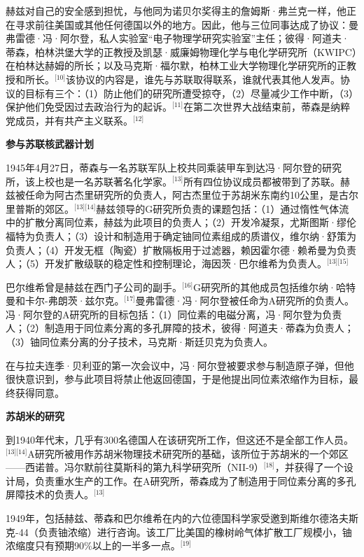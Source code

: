赫兹对自己的安全感到担忧，与他同为诺贝尔奖得主的詹姆斯·弗兰克一样，他正在寻求前往美国或其他任何德国以外的地方。因此，他与三位同事达成了协议：曼弗雷德·冯·阿尔登，私人实验室“电子物理学研究实验室”主任；彼得·阿道夫·蒂森，柏林洪堡大学的正教授及凯瑟·威廉姆物理化学与电化学研究所（KWIPC）在柏林达赫姆的所长；以及马克斯·福尔默，柏林工业大学物理化学研究所的正教授和所长。\(^\text{[10]}\)该协议的内容是，谁先与苏联取得联系，谁就代表其他人发声。协议的目标有三个：（1）防止他们的研究所遭受掠夺，（2）尽量减少工作中断，（3）保护他们免受因过去政治行为的起诉。\(^\text{[11]}\)在第二次世界大战结束前，蒂森是纳粹党成员，并有共产主义联系。\(^\text{[12]}\)

\textbf{参与苏联核武器计划}

1945年4月27日，蒂森与一名苏联军队上校共同乘装甲车到达冯·阿尔登的研究所，该上校也是一名苏联著名化学家。\(^\text{[13]}\)所有四位协议成员都被带到了苏联。赫兹被任命为阿古杰里研究所的负责人，阿古杰里位于苏胡米东南约10公里，是古尔里普斯的郊区。\(^\text{[13][14]}\)赫兹领导的G研究所负责的课题包括：（1）通过惰性气体流中的扩散分离同位素，赫兹为此项目的负责人；（2）开发冷凝泵，尤斯图斯·缪伦福特为负责人；（3）设计和制造用于确定铀同位素组成的质谱仪，维尔纳·舒策为负责人；（4）开发无框（陶瓷）扩散隔板用于过滤器，赖因霍尔德·赖希曼为负责人；（5）开发扩散级联的稳定性和控制理论，海因茨·巴尔维希为负责人。\(^\text{[13][15]}\)

巴尔维希曾是赫兹在西门子公司的副手。\(^\text{[16]}\)G研究所的其他成员包括维尔纳·哈特曼和卡尔-弗朗茨·兹尔克。\(^\text{[17]}\)曼弗雷德·冯·阿尔登被任命为A研究所的负责人。冯·阿尔登的A研究所的目标包括：（1）同位素的电磁分离，冯·阿尔登为负责人；（2）制造用于同位素分离的多孔屏障的技术，彼得·阿道夫·蒂森为负责人；（3）铀同位素分离的分子技术，马克斯·斯廷贝克为负责人。

在与拉夫连季·贝利亚的第一次会议中，冯·阿尔登被要求参与制造原子弹，但他很快意识到，参与此项目将禁止他返回德国，于是他提出同位素浓缩作为目标，最终获得同意。

\textbf{苏胡米的研究}

到1940年代末，几乎有300名德国人在该研究所工作，但这还不是全部工作人员。\(^\text{[13][14]}\)A研究所被用作苏胡米物理技术研究所的基础，该所位于苏胡米的一个郊区——西诺普。冯尔默前往莫斯科的第九科学研究所（NII-9）\(^\text{[18]}\)，并获得了一个设计局，负责重水生产的工作。在A研究所，蒂森成为了制造用于同位素分离的多孔屏障技术的负责人。\(^\text{[13]}\)

1949年，包括赫兹、蒂森和巴尔维希在内的六位德国科学家受邀到斯维尔德洛夫斯克-44（负责铀浓缩）进行咨询。该工厂比美国的橡树岭气体扩散工厂规模小，铀浓缩度只有预期90\%以上的一半多一点。\(^\text{[19]}\)

